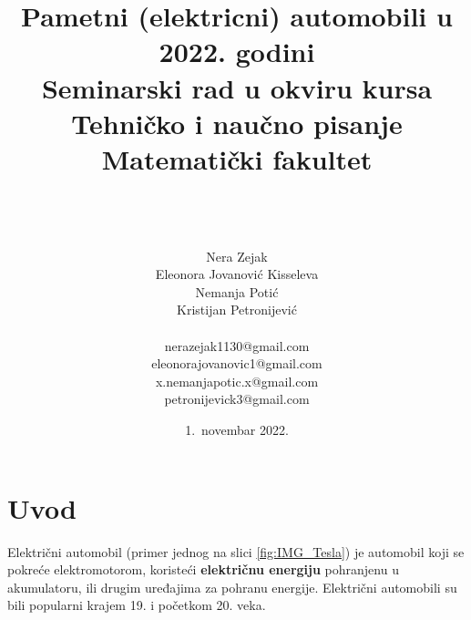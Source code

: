 \documentclass[a4paper]{article}
\begin{document}
\title{Pametni (elektricni) automobili u 2022. godini\vspace{3ex}\\ \small{Seminarski rad u okviru kursa\\Tehničko i naučno pisanje\\ Matematički fakultet}}

\author{\\\\\\Nera Zejak\\Eleonora Jovanović Kisseleva\\Nemanja Potić\\Kristijan Petronijević \\ \\nerazejak1130@gmail.com\\eleonorajovanovic1@gmail.com\\x.nemanjapotic.x@gmail.com\\ petronijevick3@gmail.com\\}
\date{1.~novembar 2022.}
\maketitle



\tableofcontents

\newpage

\section{Uvod}
   Električni automobil (primer jednog na slici \ref{fig:IMG_Tesla}) je automobil koji se pokreće elektromotorom, koristeći \textbf{električnu energiju} pohranjenu u akumulatoru, ili drugim uređajima za pohranu energije. Električni automobili su bili popularni krajem 19. i početkom 20. veka. 
        
\end{document}
